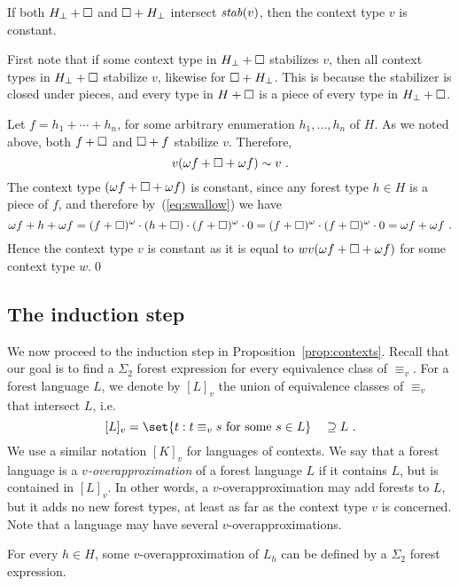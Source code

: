 \documentclass{LMCS}
\begin{document}
\begin{lem}\label{lemma:at-least-one-disjoint}
  If both ${H_\bot}+ \Box$ and $\Box + {H_\bot}$ intersect $\mathit{stab}(v)$, then
  the context type $v$ is constant.
\end{lem}
\proof
  First note that if some context type in ${H_\bot} + \Box$
  stabilizes $v$, then all context types in ${H_\bot} + \Box$
  stabilize $v$, likewise for $\Box +{H_\bot}$. This is because the
  stabilizer is closed under pieces, and every type in $H + \Box$ is
  a piece of every type in ${H_\bot} + \Box$.

  
 Let $f = h_1 + \cdots +
  h_n$, for some arbitrary enumeration $h_1,\ldots,h_n$ of $H$. As we
  noted above, both $f + \Box$ and $\Box+ f$ stabilize $v$. Therefore,
  \[
    v( \omega f + \Box  + \omega f)  \sim  v\ .
  \]
  The context type $( \omega f + \Box + \omega f)$ is constant,
  since any forest type $h \in H$ is a piece of $f$, and therefore
  by~(\ref{eq:swallow}) we have
  \[
    \omega f + h + \omega f = (f + \hole)^\omega \cdot (h + \hole)
    \cdot (f + \hole)^\omega \cdot  0  = (f + \hole)^\omega 
    \cdot (f + \hole)^\omega \cdot  0 = \omega  f + \omega f \ .
  \]
Hence the context type $v$ is constant as it is equal to $wv( \omega f
+ \Box + \omega f)$ for some context type $w$.\qed


\subsection{The induction step}
We now proceed to the induction step in
Proposition~\ref{prop:contexts}.  Recall that our goal is to find a
$\Sigma_2$ forest expression for every equivalence class of
$\equiv_v$. For a forest language $L$, we denote by $[L]_v$ the union
of equivalence classes of $\equiv_v$ that intersect $L$, i.e.
\[
  [L]_v =  \set{ t : t \equiv_v s \mbox{ for some }s \in L} \quad
  \supseteq L\ .
\]
We use a similar notation $[K]_v$ for languages of contexts.  We say
that a forest language is a \emph{$v$-overapproximation}
of a forest language $L$ if it contains $L$, but is contained in
$[L]_v$. In other words, a $v$-overapproximation may add forests to
$L$, but it adds no new forest types, at least as far as the context
type $v$ is concerned.  Note that a language may have several
$v$-overapproximations.
\begin{prop}\label{prop:overapprox}
  For every $h \in H$, some $v$-overapproximation of $L_h$ can be
  defined by a $\Sigma_2$ forest expression.
\end{prop}
\end{document}
